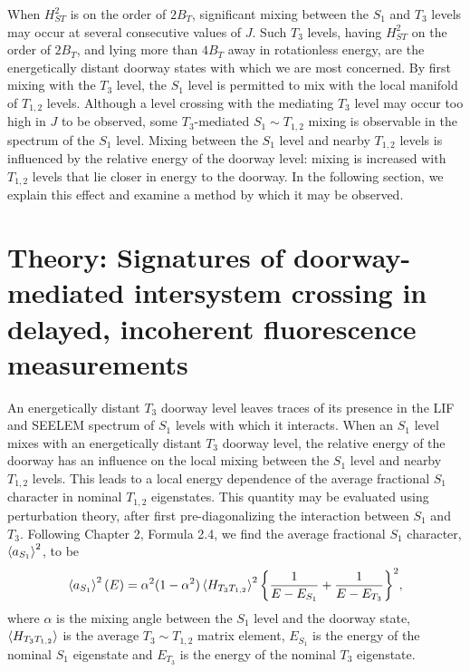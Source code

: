\documentclass[12pt]{mitthesis}
\begin{document}
When $H_{ST}^2$ is on the order of $2B_T$, significant mixing between
the $S_1$ and $T_3$ levels may occur at several consecutive values of
$J$.  Such $T_3$ levels, having $H_{ST}^2$ on the order of $2B_T$, and
lying more than $4B_T$ away in rotationless energy, are the
energetically distant doorway states with which we are most concerned.
By first mixing with the $T_3$ level, the $S_1$ level is permitted to
mix with the local manifold of $T_{1,2}$ levels.  Although a level
crossing with the mediating $T_3$ level may occur too high in $J$ to
be observed, some $T_3$-mediated $S_1 \sim T_{1,2}$ mixing is
observable in the spectrum of the $S_1$ level.  Mixing between the
$S_1$ level and nearby $T_{1,2}$ levels is influenced by the relative
energy of the doorway level: mixing is increased with $T_{1,2}$ levels
that lie closer in energy to the doorway.  In the following section,
we explain this effect and examine a method by which it may be
observed.



























\section{Theory: Signatures of doorway-mediated intersystem crossing
  in delayed, incoherent fluorescence measurements}

An energetically distant $T_3$ doorway level leaves traces of its
presence in the LIF and SEELEM spectrum of $S_1$ levels with which it
interacts.  When an $S_1$ level mixes with an energetically distant
$T_3$ doorway level, the relative energy of the doorway has an
influence on the local mixing between the $S_1$ level and nearby
$T_{1,2}$ levels.  This leads to a local energy dependence of the
average fractional $S_1$ character in nominal $T_{1,2}$ eigenstates.
This quantity may be evaluated using perturbation theory, after first
pre-diagonalizing the interaction between $S_1$ and $T_3$.  Following
Chapter 2, Formula 2.4, we find the average fractional $S_1$
character, $\mathinner{\langle{a_{S_1}}\rangle}^2$, to be
\begin{equation}
  \label{eq:ave-s1-char}
    \mathinner{\langle{a_{S_1}}\rangle}^2(E) = 
    \alpha^2 (1-\alpha^2) \mathinner{\langle{H_{T_3T_{1,2}}}\rangle}^2
    \biggl \lbrace 
    \frac{1}{E - E_{S_1}} 
    + \frac{1}{E - E_{T_3}} 
    \biggr \rbrace^2,
\end{equation}
where $\alpha$ is the mixing angle between the $S_1$ level and the
doorway state, $\mathinner{\langle{H_{T_3T_{1,2}}}\rangle}$ is the average $T_3 \sim
T_{1,2}$ matrix element, $E_{S_1}$ is the energy of the nominal $S_1$
eigenstate and $E_{T_3}$ is the energy of the nominal $T_3$
eigenstate.  
\end{document}
